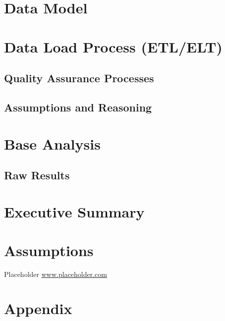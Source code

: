 \documentclass{article}
\begin{document}
    \newpage
    \section{Data Model}

    \newpage
    \section{Data Load Process (ETL/ELT)}
        \subsection{Quality Assurance Processes}
        \subsection{Assumptions and Reasoning}

    \newpage
    \section{Base Analysis}
        \subsection{Raw Results}

    \newpage
    \section{Executive Summary}

    \newpage
    \section{Assumptions}

    \newpage
    \begin{thebibliography}{9}
        \raggedright
            Placeholder
            \url{www.placeholder.com}
    \end{thebibliography}

    \newpage
    \section{Appendix}
    \label{sec:Appendix}

    
\end{document}
